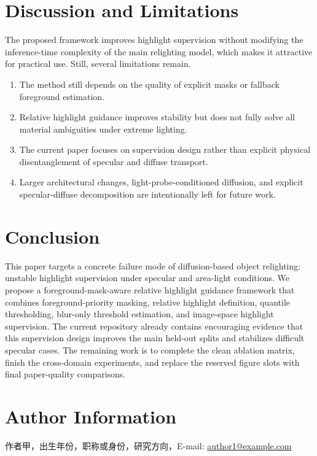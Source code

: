 \documentclass[UTF8,a4paper]{ctexart}
\begin{document}
\section{Discussion and Limitations}

The proposed framework improves highlight supervision without modifying the inference-time complexity of the main relighting model, which makes it attractive for practical use. Still, several limitations remain.

\begin{enumerate}
\item The method still depends on the quality of explicit masks or fallback foreground estimation.
\item Relative highlight guidance improves stability but does not fully solve all material ambiguities under extreme lighting.
\item The current paper focuses on supervision design rather than explicit physical disentanglement of specular and diffuse transport.
\item Larger architectural changes, light-probe-conditioned diffusion, and explicit specular-diffuse decomposition are intentionally left for future work.
\end{enumerate}

\section{Conclusion}

This paper targets a concrete failure mode of diffusion-based object relighting: unstable highlight supervision under specular and area-light conditions. We propose a foreground-mask-aware relative highlight guidance framework that combines foreground-priority masking, relative highlight definition, quantile thresholding, blur-only threshold estimation, and image-space highlight supervision. The current repository already contains encouraging evidence that this supervision design improves the main held-out splits and stabilizes difficult specular cases. The remaining work is to complete the clean ablation matrix, finish the cross-domain experiments, and replace the reserved figure slots with final paper-quality comparisons.

\section*{Author Information}

\noindent 作者甲，出生年份，职称或身份，研究方向，E-mail: \href{mailto:author1@example.com}{author1@example.com}
\end{document}
